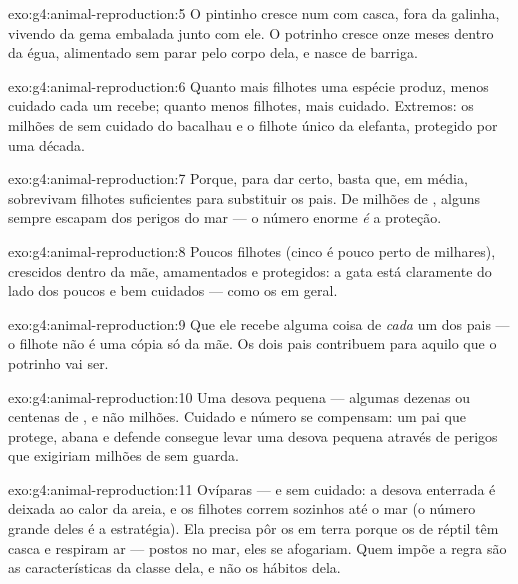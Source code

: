 \begin{solution}{exo:g4:animal-reproduction:5}
O pintinho cresce num  com casca, fora da galinha, vivendo da
gema embalada junto com ele. O potrinho cresce onze meses dentro da
égua, alimentado sem parar pelo corpo dela, e nasce de barriga.
\end{solution}

\begin{solution}{exo:g4:animal-reproduction:6}
Quanto mais filhotes uma espécie produz, menos cuidado cada um
recebe; quanto menos filhotes, mais cuidado. Extremos: os milhões de
 sem cuidado do bacalhau e o filhote único da elefanta,
protegido por uma década.
\end{solution}

\begin{solution}{exo:g4:animal-reproduction:7}
Porque, para dar certo, basta que, em média, sobrevivam filhotes
suficientes para substituir os pais. De milhões de , alguns
sempre escapam dos perigos do mar --- o número enorme \emph{é} a
proteção.
\end{solution}

\begin{solution}{exo:g4:animal-reproduction:8}
Poucos filhotes (cinco é pouco perto de milhares), crescidos dentro
da mãe, amamentados e protegidos: a gata está claramente do lado dos
poucos e bem cuidados --- como os  em geral.
\end{solution}

\begin{solution}{exo:g4:animal-reproduction:9}
Que ele recebe alguma coisa de \emph{cada} um dos pais --- o filhote
não é uma cópia só da mãe. Os dois pais contribuem para aquilo que o
potrinho vai ser.
\end{solution}

\begin{solution}{exo:g4:animal-reproduction:10}
Uma desova pequena --- algumas dezenas ou centenas de , e não
milhões. Cuidado e número se compensam: um pai que protege, abana e
defende consegue levar uma desova pequena através de perigos que
exigiriam milhões de  sem guarda.
\end{solution}

\begin{solution}{exo:g4:animal-reproduction:11}
Ovíparas --- e sem cuidado: a desova enterrada é deixada ao calor da
areia, e os filhotes correm sozinhos até o mar (o número grande
deles é a estratégia). Ela precisa pôr os  em terra porque os
 de réptil têm casca e respiram ar --- postos no mar, eles se
afogariam. Quem impõe a regra são as características da classe dela,
e não os hábitos dela.
\end{solution}
